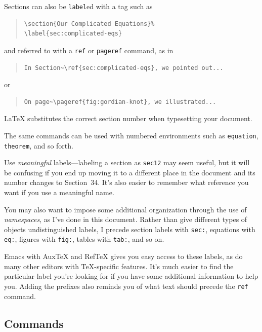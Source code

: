 \documentclass{icmmcm}
\newcommand{\bslash}{\symbol{'134}}%
\newcommand{\bsl}{{\texttt{\bslash}}}
\newcommand{\com}[1]{\bsl\texttt{#1}\xspace}
\newcommand{\env}[1]{\texttt{#1}\xspace}
\newcommand{\command}[1]{\texttt{\bsl{}#1}\xspace}
\newcommand{\tex}{\TeX\xspace}
\newcommand{\latex}{\LaTeX\xspace}
\begin{document}
Sections can also be \command{label}{}ed with a tag such as 
\begin{quote}
\begin{verbatim}
\section{Our Complicated Equations}%
\label{sec:complicated-eqs}
\end{verbatim}
\end{quote}
and referred to with a \command{ref} or \command{pageref} command, as
in
\begin{quote}
\begin{verbatim}
In Section~\ref{sec:complicated-eqs}, we pointed out...
\end{verbatim}
\end{quote}
or
\begin{quote}
\begin{verbatim}
On page~\pageref{fig:gordian-knot}, we illustrated...
\end{verbatim}
\end{quote}

\latex substitutes the correct section number when typesetting your
document.

The same commands can be used with numbered environments such as
\env{equation}, \env{theorem}, and so forth.

Use \emph{meaningful} labels---labeling a section as \texttt{sec12}
may seem useful, but it will be confusing if you end up moving it to a
different place in the document and its number changes to Section~34.
It's also easier to remember what reference you want if you use a
meaningful name.

You may also want to impose some additional organization through the
use of \emph{namespaces}, as I've done in this document.  Rather than
give different types of objects undistinguished labels, I precede
section labels with \texttt{sec:}, equations with \texttt{eq:},
figures with \texttt{fig:}, tables with \texttt{tab:}, and so on.

Emacs with Aux\tex and Ref\tex gives you easy access to these labels,
as do many other editors with \tex-specific features.  It's much
easier to find the particular label you're looking for if you have
some additional information to help you.  Adding the prefixes also
reminds you of what text should precede the \com{ref} command.


\subsection{Commands}
\end{document}
